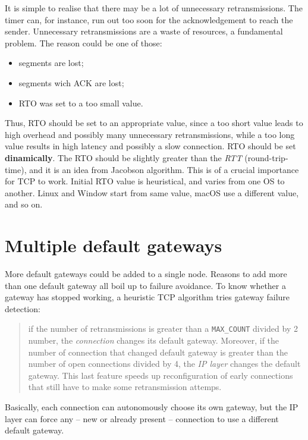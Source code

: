 \documentclass[a4paper, 11pt]{report}
\begin{document}
It is simple to realise that there may be a lot of unnecessary retransmissions.
The timer can, for instance, run out too soon for the acknowledgement to reach
the sender. Unnecessary retransmissions are a waste of resources, a fundamental
problem. The reason could be one of those:

\begin{itemize}
	\item segments are lost;
	\item segments wich ACK are lost;
	\item RTO was set to a too small value.
\end{itemize}

Thus, RTO should be set to an appropriate value, since a too short value leads
to high overhead and possibly many unnecessary retransmissions, while a too
long value results in high latency and possibly a slow connection. RTO should
be set \textbf{dinamically}. The RTO should be slightly greater than the
\emph{RTT} (round-trip-time), and it is an idea from Jacobson algorithm. This
is of a crucial importance for TCP to work. Initial RTO value is heuristical,
and varies from one OS to another. Linux and Window start from same value,
macOS use a different value, and so on.

\section{Multiple default gateways}

More default gateways could be added to a single node. Reasons to add more than
one default gateway all boil up to failure avoidance. To know whether a gateway
has stopped working, a heuristic TCP algorithm tries gateway failure detection:

\begin{quote}
	if the number of retransmissions is greater than a \texttt{MAX\_COUNT}
	divided by 2 number, the \emph{connection} changes its default gateway.
	Moreover, if the number of connection that changed default gateway is
	greater than the number of open connections divided by 4, the \emph{IP
	layer} changes the default gateway. This last feature speeds up
	reconfiguration of early connections that still have to make some
	retransmission attemps.
\end{quote}

Basically, each connection can autonomously choose its own gateway, but the IP
layer can force any \--- new or already present \--- connection to use a
different default gateway.
\end{document}

